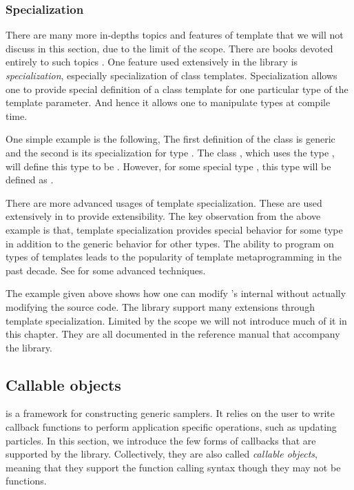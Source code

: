 \subsubsection{Specialization}
\label{ssub:Specialization}

There are many more in-depths topics and features of \cpp template that we
will not discuss in this section, due to the limit of the scope. There are
books devoted entirely to such topics \cite{cpptemplate, moderncpp}. One
feature used extensively in the \vsmc library is \emph{specialization},
especially specialization of class templates. Specialization allows one to
provide special definition of a class template for one particular type of the
template parameter. And hence it allows one to manipulate types at compile
time.

One simple example is the following,
The first definition of the class  is generic and the
second is its specialization for type . The class
, which uses the type , will define
this type to be . However, for some special type
, this type will be defined as .

There are more advanced usages of template specialization. These are used
extensively in \vsmc to provide extensibility. The key observation from the
above example is that, template specialization provides special behavior for
some type in addition to the generic behavior for other types. The ability to
program on types of \cpp templates leads to the popularity of \cpp template
metaprogramming in the past decade. See \cite{moderncpp} for some advanced
techniques.

The example given above shows how one can modify 's
internal without actually modifying the source code. The \vsmc library support
many extensions through template specialization. Limited by the scope we will
not introduce much of it in this chapter. They are all documented in the
reference manual that accompany the library.

\subsection{Callable objects}
\label{sub:Callable objects}

\vsmc is a framework for constructing generic \smc samplers. It relies on the
user to write callback functions to perform application specific operations,
such as updating particles. In this section, we introduce the few forms of
callbacks that are supported by the library. Collectively, they are also
called \emph{callable objects}, meaning that they support the function calling
syntax though they may not be functions.

